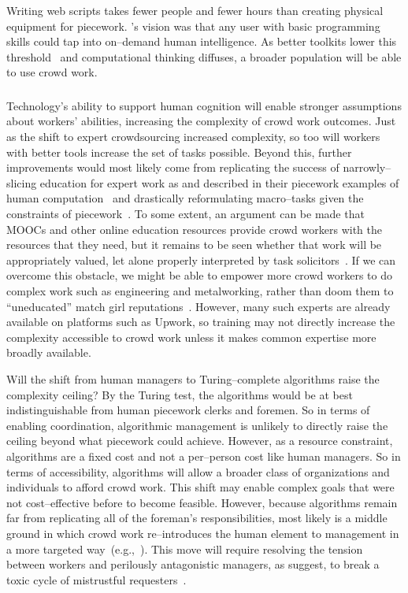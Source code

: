 \documentclass[trackingWork]{subfiles}
\begin{document}
Writing web scripts takes fewer people and fewer hours than creating physical equipment for piecework.
\citeauthor{turkitLittle}'s vision was that any user with basic programming skills could tap into on--demand human intelligence.
As better toolkits lower this threshold~\cite{myers2000past} and computational thinking diffuses, a broader population will be able to use crowd work.

\subsubsection{\implication}
Technology's ability to support human cognition will enable stronger assumptions about workers' abilities, increasing the complexity of crowd work outcomes.
Just as the shift to expert crowdsourcing increased complexity, so too will workers with better tools increase the set of tasks possible.
Beyond this, further improvements would most likely come from replicating the success of narrowly--slicing education for expert work as \citeauthor{hart2013rise} and \citeauthor{grier2013computers} described in their piecework examples
of human computation~\cite{grier2013computers} and drastically reformulating macro--tasks given the constraints of piecework~\cite{hart2013rise}.
To some extent, an argument can be made that
MOOCs and other online education resources
provide crowd workers with the resources that they need, but 
it remains to be seen whether that work will be appropriately valued, let alone
properly interpreted by task solicitors~\cite{aguaded2013mooc}.
If we can overcome this obstacle,
we might be able to empower more crowd workers to do complex work such as engineering and metalworking,
rather than doom them to ``uneducated'' match girl reputations~\cite{10.2307/3827491}.
However, many such experts are already available on platforms such as Upwork, so training may not directly increase the complexity accessible to crowd work unless it makes common expertise more broadly available.

Will the shift from human managers to Turing--complete algorithms raise the complexity ceiling? 
By the Turing test, the algorithms would be at best indistinguishable from human piecework clerks and foremen.
So in terms of enabling coordination, algorithmic management is unlikely to directly raise the ceiling beyond what piecework could achieve.
However, as a resource constraint, algorithms are a fixed cost and not a per--person cost like human managers.
So in terms of accessibility, algorithms will allow a broader class of organizations and individuals to afford crowd work.
This shift may enable complex goals that were not cost--effective before to become feasible.
However, because algorithms remain far from replicating all of the foreman's responsibilities,
most likely is a middle ground in which crowd work re--introduces
the human element to management in a more targeted way~(e.g.,~\cite{haas2015argonaut,kulkarni2012mobileworks,crowdguilds}).
This move will require resolving the tension between workers and perilously antagonistic managers, as \citeauthor{10.2307/2118435} suggest, to break a toxic cycle of mistrustful requesters~\cite{MaliciousCrowdworkersGadiraju}.
\end{document}

